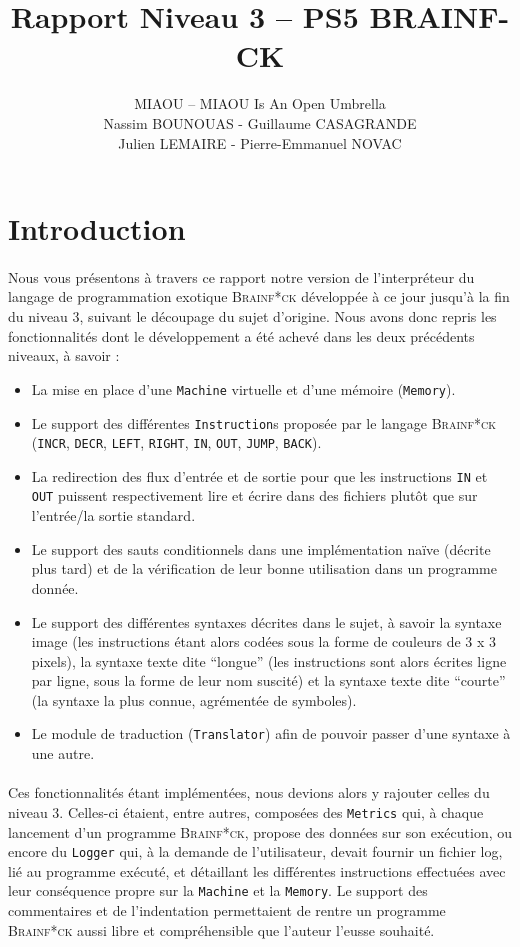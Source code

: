 \documentclass[a4paper]{article}
\title{Rapport Niveau 3 – PS5 BRAINF-CK}
\author{MIAOU – MIAOU Is An Open Umbrella\\
Nassim BOUNOUAS - Guillaume CASAGRANDE \\ Julien LEMAIRE - Pierre-Emmanuel NOVAC}
\begin{document}
\maketitle

\section{Introduction}
\paragraph{}Nous vous présentons à travers ce rapport notre version de l'interpréteur du langage de programmation exotique \textsc{Brainf*ck} développée à ce jour jusqu'à la fin du niveau 3, suivant le découpage du sujet d'origine. Nous avons donc repris les fonctionnalités dont le développement a été achevé dans les deux précédents niveaux, à savoir :\\
\begin{itemize}
	\item La mise en place d'une \texttt{Machine} virtuelle et d'une mémoire (\texttt{Memory}).
	\item Le support des différentes \texttt{Instruction}s proposée par le langage \textsc{Brainf*ck} (\texttt{INCR}, \texttt{DECR}, \texttt{LEFT}, \texttt{RIGHT}, \texttt{IN}, \texttt{OUT}, \texttt{JUMP}, \texttt{BACK}).
	\item La redirection des flux d'entrée et de sortie pour que les instructions \texttt{IN} et \texttt{OUT} puissent respectivement lire et écrire dans des fichiers plutôt que sur l'entrée/la sortie standard.
	\item Le support des sauts conditionnels dans une implémentation naïve (décrite plus tard) et de la vérification de leur bonne utilisation dans un programme donnée.
	\item Le support des différentes syntaxes décrites dans le sujet, à savoir la syntaxe image (les instructions étant alors codées sous la forme de couleurs de 3 x 3 pixels), la syntaxe texte dite ``longue'' (les instructions sont alors écrites ligne par ligne, sous la forme de leur nom suscité) et la syntaxe texte dite ``courte'' (la syntaxe la plus connue, agrémentée de symboles).
	\item Le module de traduction (\texttt{Translator}) afin de pouvoir passer d'une syntaxe à une autre.
\end{itemize}
\paragraph{}Ces fonctionnalités étant implémentées, nous devions alors y rajouter celles du niveau 3. Celles-ci étaient, entre autres, composées des \texttt{Metrics} qui, à chaque lancement d'un programme \textsc{Brainf*ck}, propose des données sur son exécution, ou encore du \texttt{Logger} qui, à la demande de l'utilisateur, devait fournir un fichier log, lié au programme exécuté, et détaillant les différentes instructions effectuées avec leur conséquence propre sur la \texttt{Machine} et la \texttt{Memory}. Le support des commentaires et de l'indentation permettaient de rentre un programme \textsc{Brainf*ck} aussi libre et compréhensible que l'auteur l'eusse souhaité.
\end{document}
